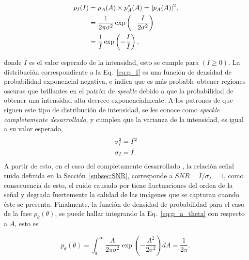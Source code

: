 
\begin{align}
\label{eq:p_I}
p_I(I) &= p_A(A) \times p_A^{\ast}(A) = \lvert p_A(A)\rvert ^2, \notag\\
&= \frac{1}{2\pi\sigma^2}\exp\left(-\frac{I}{2\sigma^2}\right)\notag\\
&= \frac{1}{\bar{I}}\exp\left(-\frac{I}{\bar{I}}\right),
\end{align}


\noindent donde $\bar{I}$ es el valor esperado de la intensidad, esto se cumple para $(I\geq0)$. La distribución correspondiente a la Eq.~\ref{eq:p_I} es una función de densidad de probabilidad exponencial negativa, e indica que es más probable obtener regiones oscuras que brillantes en el patrón de \textit{speckle} debido a que la probabilidad de obtener una intensidad alta decrece exponencialmente. A los patrones de \speckle que siguen este tipo de distribución de intensidad, se les conoce como \textit{speckle completamente desarrollado}, y cumplen que la varianza de la intensidad, es igual a su valor esperado,
\begin{align}
\sigma_I^2 &= \bar{I}^2 \notag\\
\sigma_I & = \bar{I}.
\end{align}
A partir de esto, en el caso del \speckle completamente desarrollado \cite{Goodman1976}, la relación señal ruido definida en la Sección~\ref{subsec:SNR}, corresponde a $SNR = \bar{I}/\sigma_I = 1$, como consecuencia de esto, el ruido causado por \speckle tiene fluctuaciones del orden de la señal y degrada fuertemente la calidad de las imágenes que se capturan cuando éste se presenta. Finalmente, la función de densidad de probabilidad para el caso de la fase $p_{\theta}(\theta)$, se puede hallar integrando la Eq.~\ref{eq:p_a_theta} con respecto a $A$, esto es

\begin{equation}
p_\theta (\theta) = \int_{0}^{\infty} \frac{A}{2\pi\sigma^2}\exp\left(-\frac{A^2}{2\sigma^2}\right)dA = \frac{1}{2\pi},
\end{equation}

